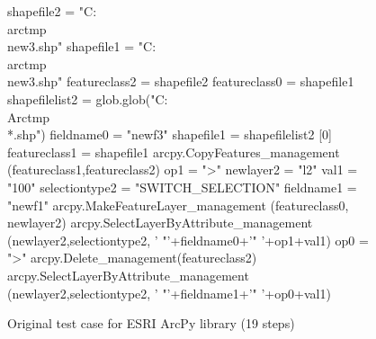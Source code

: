 \begin{figure}
{\scriptsize 
\begin{code}
shapefile2 = "C:\\arctmp\\new3.shp" 
shapefile1 = "C:\\arctmp\\new3.shp" 
featureclass2 = shapefile2 
featureclass0 = shapefile1 
shapefilelist2 = 
   glob.glob("C:\\Arctmp\\*.shp") 
fieldname0 = "newf3" 
shapefile1 = shapefilelist2 [0] 
featureclass1 = shapefile1 
arcpy.CopyFeatures\_management
   (featureclass1,featureclass2) 
op1 = ">" 
newlayer2 = "l2" 
val1 = "100" 
selectiontype2 = "SWITCH\_SELECTION" 
fieldname1 = "newf1" 
arcpy.MakeFeatureLayer\_management
   (featureclass0, newlayer2) 
arcpy.SelectLayerByAttribute\_management
   (newlayer2,selectiontype2,
   ' "'+fieldname0+'" '+op1+val1) 
op0 = ">" 
arcpy.Delete\_management(featureclass2) 
arcpy.SelectLayerByAttribute\_management
   (newlayer2,selectiontype2,
   ' "'+fieldname1+'" '+op0+val1) 
\end{code}
}
\caption{Original test case for ESRI ArcPy library (19 steps)}
\label{esriorig}
\end{figure}

